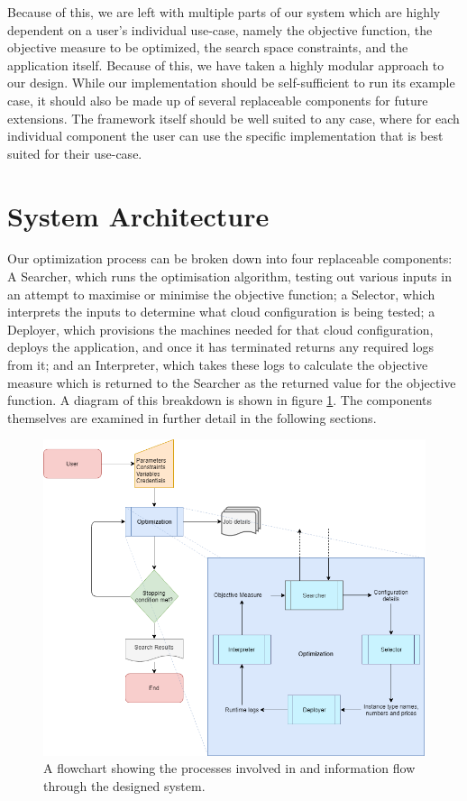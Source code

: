 \documentclass{report}
\begin{document}
Because of this, we are left with multiple parts of our system which are highly dependent on a user's individual use-case, namely the objective function, the objective measure to be optimized, the search space constraints, and the application itself. Because of this, we have taken a highly modular approach to our design. While our implementation should be self-sufficient to run its example case, it should also be made up of several replaceable components for future extensions. The framework itself should be well suited to any case, where for each individual component the user can use the specific implementation that is best suited for their use-case.
 
\section{System Architecture}
Our optimization process can be broken down into four replaceable components: A Searcher, which runs the optimisation algorithm, testing out various inputs in an attempt to maximise or minimise the objective function; a Selector, which interprets the inputs to determine what cloud configuration is being tested; a Deployer, which provisions the machines needed for that cloud configuration, deploys the application, and once it has terminated returns any required logs from it; and an Interpreter, which takes these logs to calculate the objective measure which is returned to the Searcher as the returned value for the objective function. A diagram of this breakdown is shown in figure \ref{fig:design}. The components themselves are examined in further detail in the following sections.
\begin{figure}[!hb]
  \centering
   \includegraphics[scale=0.5]{Design_flowchart}
  \caption{A flowchart showing the processes involved in and information flow through the designed system.}
  \label{fig:design}
\end{figure}
\newpage
 
\end{document}
